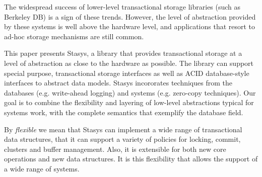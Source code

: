 \documentclass[letterpaper,twocolumn,10pt]{article}
\newcommand{\yad}{Stasys\xspace}
\newcommand{\eat}[1]{}
\begin{document}
\eat{
Examples of real world systems that currently fall into this category
are web search engines, document repositories, large-scale web-email
services, map and trip planning services, ticket reservation systems,
photo and video repositories, bioinformatics, version control systems,
workflow applications, CAD/VLSI applications and directory services.

In short, we believe that a fundamental architectural shift in
transactional storage is necessary before general purpose storage
systems are of practical use to modern applications.
Until this change occurs, databases' imposition of unwanted
abstraction upon their users will restrict system designs and
implementations.
}

%

The widespread success of lower-level transactional storage libraries
(such as Berkeley DB) is a sign of these trends.  However, the level
of abstraction provided by these systems is well above the hardware
level, and applications that resort to ad-hoc storage mechanisms are
still common.

This paper presents \yad, a library that provides transactional
storage at a level of abstraction as close to the hardware as
possible.  The library can support special purpose, transactional
storage interfaces as well as ACID database-style interfaces to
abstract data models.  \yad incororates techniques from the databases
(e.g. write-ahead logging) and systems (e.g. zero-copy techniques).
Our goal is to combine the flexibility and layering of low-level
abstractions typical for systems work, with the complete semantics
that exemplify the database field.

By {\em flexible} we mean that \yad{}  can implement a wide
range of transactional data structures, that it can support a variety
of policies for locking, commit, clusters and buffer management.
Also, it is extensible for both new core operations
and new data structures. It is this flexibility that allows the
support of a wide range of systems.
\end{document}
